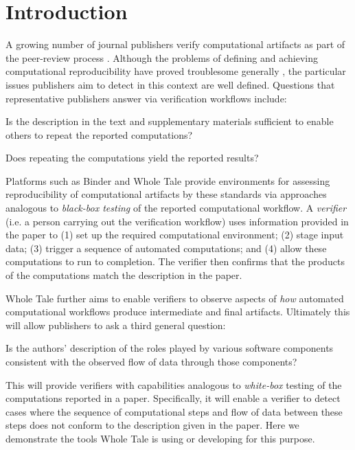 \vspace*{-1em}

\section{Introduction}

A growing number of journal publishers verify computational artifacts as part of the peer-review process \cite{Willis2020Trust}. Although the problems of defining and achieving computational reproducibility have proved troublesome generally \cite{reproducibilitynas}, the particular issues publishers aim to detect in this context are well defined. Questions that representative publishers answer via verification workflows include:

\begin{itemize}

\tinyitem Is the description in the text and supplementary materials sufficient to enable others to repeat the reported computations?

\tinyitem Does repeating the computations yield the reported results?

\end{itemize}

Platforms such as Binder \cite{Binder_2018} and Whole Tale  \cite{brinckman2019computing} provide environments for assessing reproducibility of computational artifacts by these standards via approaches analogous to \emph{black-box testing} of the reported computational workflow. A \emph{verifier} (i.e. a person carrying out the verification workflow) uses information provided in the paper to (1) set up the required computational environment; (2) stage input data; (3) trigger a sequence of automated computations; and (4) allow these computations to run to completion. The verifier then confirms that the products of the computations match the description in the paper.

Whole Tale further aims to enable verifiers to observe aspects of \emph{how} automated computational workflows produce intermediate and final artifacts. Ultimately this will allow publishers to ask a third general question:

\begin{itemize}

\tinyitem Is the authors' description of the roles played by various software components consistent with the observed flow of data through those components?

\end{itemize}

This will provide verifiers with capabilities analogous to \emph{white-box} testing of the computations reported in a paper. Specifically, it will enable a verifier to detect cases where the sequence of computational steps and flow of data between these steps does not conform to the description given in the paper. Here we demonstrate the tools Whole Tale is using or developing 
for this purpose.








